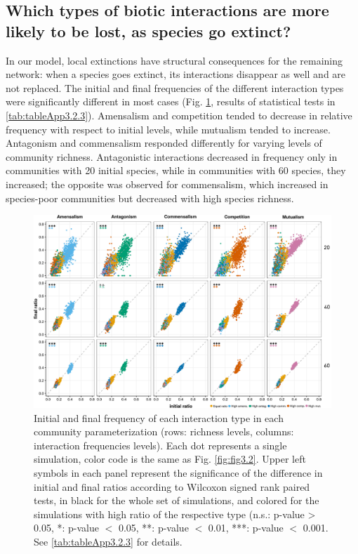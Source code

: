 \FloatBarrier

\subsection*{Which types of biotic interactions are more likely to be lost, as species go extinct?}

In our model, local extinctions have structural consequences for the remaining network: when a species goes extinct, its interactions disappear as well and are not replaced. The initial and final frequencies of the different interaction types were significantly different in most cases (Fig. \ref{fig:fig3.3}, results of statistical tests in \cref{tab:tableApp3.2.3}). Amensalism and competition tended to decrease in relative frequency with respect to initial levels, while mutualism tended to increase. Antagonism and commensalism responded differently for varying levels of community richness. Antagonistic interactions decreased in frequency only in communities with 20 initial species, while in communities with 60 species, they increased; the opposite was observed for commensalism, which increased in species-poor communities but decreased with high species richness.

\begin{figure}[!ht]
\centering
\includegraphics[width=\textwidth]{./Figures/chapter03/Fig_3.png}
\caption[Initial and final interaction ratios]{\color{Gray} Initial and final frequency of each interaction type in each community parameterization (rows: richness levels, columns: interaction frequencies levels). Each dot represents a single simulation, color code is the same as Fig. \ref{fig:fig3.2}. Upper left symbols in each panel represent the significance of the difference in initial and final ratios according to Wilcoxon signed rank paired tests, in black for the whole set of simulations, and colored for the simulations with high ratio of the respective type (n.s.: p-value > 0.05, *: p-value $<$ 0.05, **: p-value $<$ 0.01, ***: p-value $<$ 0.001. See \cref{tab:tableApp3.2.3} for details.}
\label{fig:fig3.3}
\end{figure}

